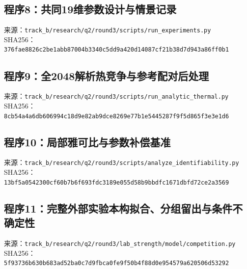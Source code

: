 \subsection*{程序8：共同19维参数设计与情景记录}
\noindent 来源：\nolinkurl{track_b/research/q2/round3/scripts/run_experiments.py}\\
\noindent SHA256：\texttt{376fae8826c2be1abb87004b3340c5dd}\allowbreak\texttt{9a420d14087cf21b38d7d943a86ff0b1}\\
\clearpage
\subsection*{程序9：全2048解析热竞争与参考配对后处理}
\noindent 来源：\nolinkurl{track_b/research/q2/round3/scripts/run_analytic_thermal.py}\\
\noindent SHA256：\texttt{8cb54a4a6db606994c18d9e82ab9dce8}\allowbreak\texttt{269e77b1e5445287f9f5d865f3e3e1d6}\\
\clearpage
\subsection*{程序10：局部雅可比与参数补偿基准}
\noindent 来源：\nolinkurl{track_b/research/q2/round3/scripts/analyze_identifiability.py}\\
\noindent SHA256：\texttt{13bf5a0542300cf60b7b6f693fdc3189}\allowbreak\texttt{e055d58b9bbdfc1671dbfd72ce2a3569}\\
\clearpage
\subsection*{程序11：完整外部实验本构拟合、分组留出与条件不确定性}
\noindent 来源：\nolinkurl{track_b/research/q2/round3/lab_strength/model/competition.py}\\
\noindent SHA256：\texttt{5f93736b630b683ad52ba0c7d9fbca0f}\allowbreak\texttt{e9f50b4f88d0e954579a620506d53292}\\
\clearpage
